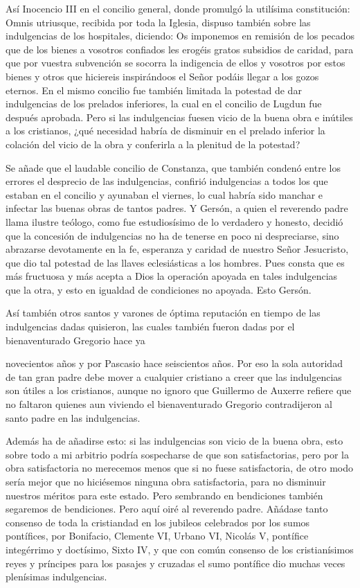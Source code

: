 Así Inocencio III en el concilio general, donde promulgó la utilísima constitución: Omnis utriusque, recibida por toda la Iglesia, dispuso también sobre las indulgencias de los hospitales, diciendo: Os imponemos en remisión de los pecados que de los bienes a vosotros confiados les erogéis gratos subsidios de caridad, para que por vuestra subvención se socorra la indigencia de ellos y vosotros por estos bienes y otros que hiciereis inspirándoos el Señor podáis llegar a los gozos eternos. En el mismo concilio fue también limitada la potestad de dar indulgencias de los prelados inferiores, la cual en el concilio de Lugdun fue después aprobada. Pero si las indulgencias fuesen vicio de la buena obra e inútiles a los cristianos, ¿qué necesidad habría de disminuir en el prelado inferior la colación del vicio de la obra y conferirla a la plenitud de la potestad?

Se añade que el laudable concilio de Constanza, que también condenó entre los errores el desprecio de las indulgencias, confirió indulgencias a todos los que estaban en el concilio y ayunaban el viernes, lo cual habría sido manchar e infectar las buenas obras de tantos padres. Y Gersón, a quien el reverendo padre llama ilustre teólogo, como fue estudiosísimo de lo verdadero y honesto, decidió que la concesión de indulgencias no ha de tenerse en poco ni despreciarse, sino abrazarse devotamente en la fe, esperanza y caridad de nuestro Señor Jesucristo, que dio tal potestad de las llaves eclesiásticas a los hombres. Pues consta que es más fructuosa y más acepta a Dios la operación apoyada en tales indulgencias que la otra, y esto en igualdad de condiciones no apoyada. Esto Gersón.

Así también otros santos y varones de óptima reputación en tiempo de las indulgencias dadas quisieron, las cuales también fueron dadas por el bienaventurado Gregorio hace ya

novecientos años y por Pascasio hace seiscientos años. Por eso la sola autoridad de tan gran padre debe mover a cualquier cristiano a creer que las indulgencias son útiles a los cristianos, aunque no ignoro que Guillermo de Auxerre refiere que no faltaron quienes aun viviendo el bienaventurado Gregorio contradijeron al santo padre en las indulgencias.

Además ha de añadirse esto: si las indulgencias son vicio de la buena obra, esto sobre todo a mi arbitrio podría sospecharse de que son satisfactorias, pero \marginpar{\small[346]} por la obra satisfactoria no merecemos menos que si no fuese satisfactoria, de otro modo sería mejor que no hiciésemos ninguna obra satisfactoria, para no disminuir nuestros méritos para este estado. Pero sembrando en bendiciones también segaremos de bendiciones. Pero aquí oiré al reverendo padre. Añádase tanto consenso de toda la cristiandad en los jubileos celebrados por los sumos pontífices, por Bonifacio, Clemente VI, Urbano VI, Nicolás V, pontífice integérrimo y doctísimo, Sixto IV, y que con común consenso de los cristianísimos reyes y príncipes para los pasajes y cruzadas el sumo pontífice dio muchas veces plenísimas indulgencias.

